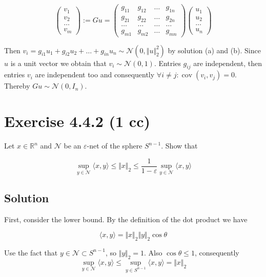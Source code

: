 \documentclass{article}
\DeclareMathOperator{\cov}{cov}
\begin{document}
$$
\begin{pmatrix}
    v_1 \\
    v_2 \\
    \dots \\
    v_m
\end{pmatrix} :=
Gu = 
\begin{pmatrix}
    g_{11} & g_{12} & \dots & g_{1n} \\
    g_{21} & g_{22} & \dots & g_{2n} \\
    \dots & \dots & \dots & \dots \\
    g_{m1} & g_{m2} & \dots & g_{mn}
\end{pmatrix}
\begin{pmatrix}
    u_1 \\
    u_2 \\
    \dots \\
    u_n
\end{pmatrix}
$$

Then $v_i = g_{i1}u_1 + g_{i2}u_2 + \dots + g_{in}u_n \sim \mathcal N (0, \Vert u \Vert^2_2)$ by solution (a) and (b). Since $u$ is a unit vector we obtain that $v_i \sim \mathcal N (0, 1)$. Entries $g_{ij}$ are independent, then entries $v_i$ are independent too and consequently $\forall i \neq j: \cov(v_i, v_j) = 0$. Thereby $Gu \sim \mathcal N (0, I_n)$.

\section{Exercise 4.4.2 (1 cc)}

Let $x \in \mathbb R^n$ and $ \mathcal N$ be an $\varepsilon$-net of the sphere $S^{n-1}$. Show that

$$\sup_{y \in \mathcal N} \langle x, y \rangle \leq \Vert x \Vert_2 \leq \frac{1}{1-\varepsilon}\sup_{y \in \mathcal N}\langle x, y \rangle$$

\subsection{Solution}

First, consider the lower bound. By the definition of the dot product we have

$$\langle x, y \rangle = \Vert x \Vert_2 \Vert y \Vert_2 \cos \theta$$

Use the fact that $y \in \mathcal N \subset S^{n-1}$, so $\Vert y \Vert_2 = 1$. Also $\cos \theta \leq 1$, consequently
$$\sup_{y \in \mathcal N} \langle x, y \rangle \leq \sup_{y \in S^{n-1}} \langle x, y \rangle = \Vert x \Vert_2$$
\end{document}
